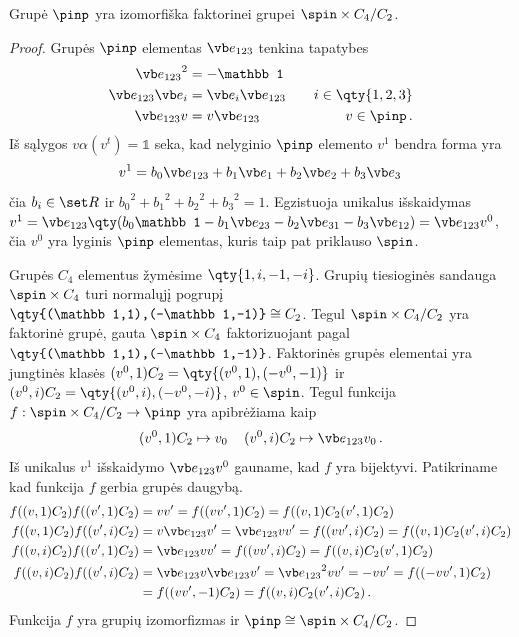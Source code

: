 \begin{proposition}
	Grupė $\pinp$ yra izomorfiška faktorinei grupei $\spin \times C_4 /C_2$.
\end{proposition}
\begin{proof}
	Grupės $\pinp$ elementas $\vb e_{123}$ tenkina tapatybes
	\begin{equation}
		\begin{aligned}
			{\vb e_{123}}^2 &= -\mathbb1
			\\
			\vb e_{123} \vb e_i &= \vb e_i  \vb e_{123} \quad &i \in \qty{1,2,3}
			\\
			\vb e_{123} v &= v  \vb e_{123} \quad &v \in \pinp
			\,.
		\end{aligned}
	\end{equation}
	Iš sąlygos $v\alpha(v^t) = \mathbb1$ seka, kad nelyginio $\pinp$ elemento $v^1$ bendra forma yra
	\begin{equation}
		v^1 = 
		b_0 \vb e_{123}
		+ b_1 \vb e_1
		+ b_2 \vb e_2
		+ b_3 \vb e_3
		\,
	\end{equation}
	čia $b_i \in \set R$ ir
	${b_0}^2 + {b_1}^2 + {b_2}^2 + {b_3}^2 = 1$.
	Egzistuoja unikalus išskaidymas
	$ v^1 = \vb e_{123} \qty({
		b_0 \mathbb1
		- b_1 \vb e_{23}
		- b_2 \vb e_{31}
		- b_3 \vb e_{12}
	})= \vb e_{123} v^0 $, čia $v^0$ yra lyginis $\pinp$ elementas,
	kuris taip pat priklauso $\spin$.

	Grupės $C_4$ elementus žymėsime $\qty{1,i,-1,-i}$.
	Grupių tiesioginės sandauga $\spin \times C_4$
	turi normalųjį pogrupį $\qty{(\mathbb1,1),(-\mathbb1,-1)} \cong C_2$.
	Tegul $\spin \times C_4 /C_2$ yra faktorinė grupė, gauta $\spin \times C_4$ faktorizuojant pagal $\qty{(\mathbb1,1),(-\mathbb1,-1)}$.
	Faktorinės grupės elementai yra jungtinės klasės $(v^0,1)C_2 = \qty{(v^0,1),(-v^0,-1)}$ ir $(v^0,i)C_2 = \qty{(v^0,i),(-v^0,-i)}$,
	$v^0 \in \spin$.
	Tegul funkcija $f: \spin \times C_4 /C_2 \to \pinp$ yra apibrėžiama kaip 
	\begin{equation}
		(v^0,1)C_2 \mapsto v_0
		\,\quad
		(v^0,i)C_2 \mapsto \vb e_{123}v_0
		\,.
	\end{equation}
	Iš unikalus $v^1$ išskaidymo $\vb e_{123} v^0$ gauname,
	kad $f$ yra bijektyvi.
	Patikriname kad funkcija $f$ gerbia grupės daugybą.
	\begin{align}
		f((v,1)C_2)f((v',1)C_2) &= vv' = f((vv',1)C_2) = f((v,1)C_2(v',1)C_2)
		\\
		f((v,1)C_2)f((v',i)C_2) &= v\vb e_{123}v' = \vb e_{123}vv' = f((vv', i)C_2) = f((v,1)C_2(v',i)C_2)
		\\
		f((v,i)C_2)f((v',1)C_2) &= \vb e_{123}vv' = f((vv', i)C_2) = f((v,i)C_2(v',1)C_2)
		\\
		f((v,i)C_2)f((v',i)C_2) &= \vb e_{123}v\vb e_{123}v' = {\vb e_{123}}^2 vv' = - vv'= f((-vv', 1)C_2) \nonumber
		\\ &=f ((vv', -1)C_2) = f((v,i)C_2(v',i)C_2)
		\,.
	\end{align}
	Funkcija $f$ yra grupių izomorfizmas ir $\pinp \cong \spin \times C_4/C_2$.
\end{proof}



